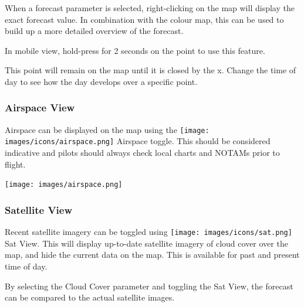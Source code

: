 \documentclass[11pt,a4paper]{article}
\begin{document}
When a forecast parameter is selected, right-clicking on the map will display the exact forecast value. In combination with the colour map, this can be used to build up a more detailed overview of the forecast.

In mobile view, hold-press for 2 seconds on the point to use this feature.

\begin{tip}
\item This point will remain on the map until it is closed by the x. Change the time of day to see how the day develops over a specific point.
\end{tip}

\subsubsection{Airspace View}
Airspace can be displayed on the map using the \texttt{[image: images/icons/airspace.png]} Airspace toggle. This should be considered indicative and pilots should always check local charts and NOTAMs prior to flight.
\begin{center}
\texttt{[image: images/airspace.png]}
\end{center}

\subsubsection{Satellite View}\label{subsec:satview}
Recent satellite imagery can be toggled using \texttt{[image: images/icons/sat.png]} Sat View. This will display up-to-date satellite imagery of cloud cover over the map, and hide the current data on the map. This is available for past and present time of day.

\begin{tip}
\item By selecting the Cloud Cover parameter and toggling the Sat View, the forecast can be compared to the actual satellite images.\end{tip}

\end{document}
